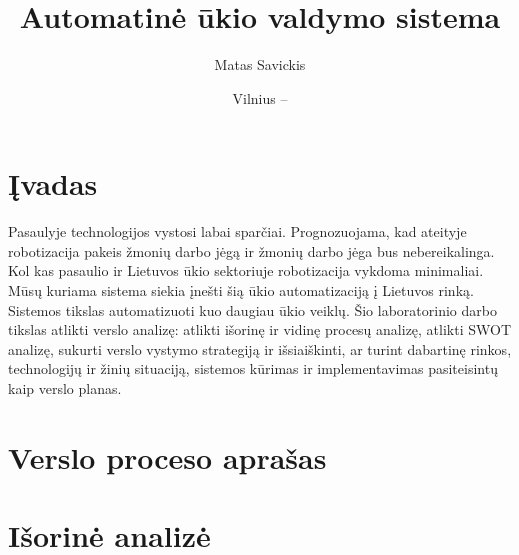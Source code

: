 \documentclass[oneside]{VUMIFPSkursinis}
\title{Automatinė ūkio valdymo sistema}
\author{Matas Savickis}
\date{Vilnius – \the\year}
\begin{document}
\maketitle
\tableofcontents


\section{Įvadas}
Pasaulyje technologijos vystosi labai sparčiai. Prognozuojama, kad ateityje robotizacija pakeis žmonių darbo jėgą ir žmonių darbo jėga bus nebereikalinga. Kol kas pasaulio ir Lietuvos ūkio sektoriuje robotizacija vykdoma minimaliai. Mūsų kuriama sistema siekia įnešti šią ūkio automatizaciją į Lietuvos rinką. Sistemos tikslas automatizuoti kuo daugiau ūkio veiklų. Šio laboratorinio darbo tikslas atlikti verslo analizę: atlikti išorinę ir vidinę procesų analizę, atlikti SWOT analizę, sukurti verslo vystymo strategiją ir išsiaiškinti, ar turint dabartinę rinkos, technologijų ir žinių situaciją, sistemos kūrimas ir implementavimas pasiteisintų kaip verslo planas.
\section{Verslo proceso aprašas}

\section{Išorinė analizė}
\end{document}
